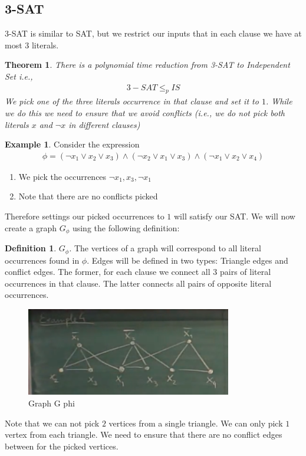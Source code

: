 \documentclass[a4paper]{article}
\theoremstyle{plain}
\newtheorem{thm}{Theorem}[section]
\theoremstyle{definition}
\newtheorem{defn}{Definition}[section]
\newtheorem{exmp}{Example}[section]
\theoremstyle{remark}
\begin{document}
	\subsection{3-SAT}
	3-SAT is similar to SAT, but we restrict our inputs that in each clause we have at most $3$ literals.
	\begin{thm}
		There is a polynomial time reduction from 3-SAT to Independent Set i.e.,
		\begin{align*}
			3-SAT \le_p IS
		\end{align*}
		We pick one of the three literals occurrence in that clause and set it to $1$. While we do this we need to ensure that we avoid conflicts (i.e., we do not pick both literals $x$ and $\neg x$ in different clauses)
	\end{thm}
	\begin{exmp}
		Consider the expression
		\begin{align*}
			\phi = (\neg x_1 \lor x_2 \lor x_3) \land (\neg x_2 \lor x_1 \lor x_3) \land (\neg x_1 \lor x_2 \lor x_4)
		\end{align*}
		\begin{enumerate}
			\item We pick the occurrences $\neg x_1, x_3, \neg x_1$ 
			\item Note that there are no conflicts picked
		\end{enumerate}
		Therefore settings our picked occurrences to $1$ will satisfy our SAT. We will now create a graph $G_\phi$ using the following definition:
		\begin{defn}
			$G_\phi$. The vertices of a graph will correspond to all literal occurrences found in $\phi$. Edges will be defined in two types: Triangle edges and conflict edges. The former, for each clause we connect all $3$ pairs of literal occurrences in that clause. The latter connects all pairs of opposite literal occurrences. 
		\end{defn}
		\begin{figure}[H]
			\centering
			\includegraphics[width=0.8\textwidth]{one.png}
			\caption{Graph G phi}
			\label{fig:one-png}
		\end{figure}
		Note that we can not pick $2$ vertices from a single triangle. We can only pick $1$ vertex from each triangle. We need to ensure that there are no conflict edges between for the picked vertices. 
	\end{exmp}
\end{document}
